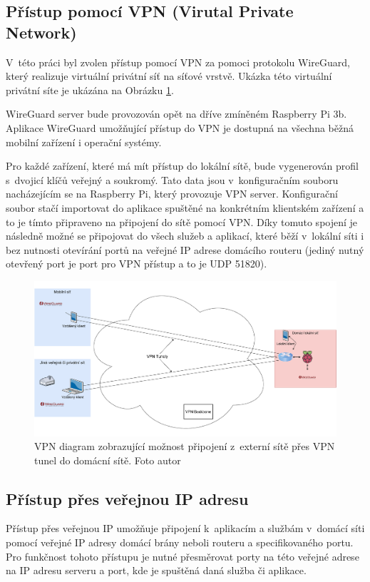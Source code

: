 \subsection*{Přístup pomocí VPN (Virutal Private Network)} \label{VPN-connection}
V~této práci byl zvolen přístup pomocí VPN za pomoci protokolu WireGuard, který realizuje virtuální privátní síť na síťové vrstvě. Ukázka této virtuální privátní síte je ukázána na Obrázku \ref{vpnDiagram}.

WireGuard server bude provozován opět na dříve zmíněném Raspberry Pi 3b. Aplikace WireGuard umožňující přístup do VPN je dostupná na všechna běžná mobilní zařízení i operační systémy. 

Pro každé zařízení, které má mít přístup do lokální sítě, bude vygenerován profil s~dvojicí klíčů veřejný a soukromý. Tato data jsou v~konfiguračním souboru nacházejícím se na Raspberry Pi, který provozuje VPN server. Konfigurační soubor stačí importovat do aplikace spuštěné na konkrétním klientském zařízení a to je tímto připraveno na připojení do sítě pomocí VPN. Díky tomuto spojení je následně možné se připojovat do všech služeb a aplikací, které běží v~lokální síti i bez nutnosti otevírání portů na veřejné IP adrese domácího routeru (jediný nutný otevřený port je port pro VPN přístup a to je UDP 51820). 

\begin{figure}[H]
  \centering
  \includegraphics[width=\textwidth]{obrazky-figures/diagrams/VPN diagram.pdf}
  \caption{VPN diagram zobrazující možnost připojení z~externí sítě přes VPN tunel do domácní sítě. Foto autor}
  \label{vpnDiagram}
\end{figure}

\subsection*{Přístup přes veřejnou IP adresu}
Přístup přes veřejnou IP umožňuje připojení k~aplikacím a službám v~domácí síti pomocí veřejné IP adresy domácí brány neboli routeru a specifikovaného portu. Pro funkčnost tohoto přístupu je nutné přesměrovat porty na této veřejné adrese na IP adresu serveru a port, kde je spuštěná daná služba či aplikace.

